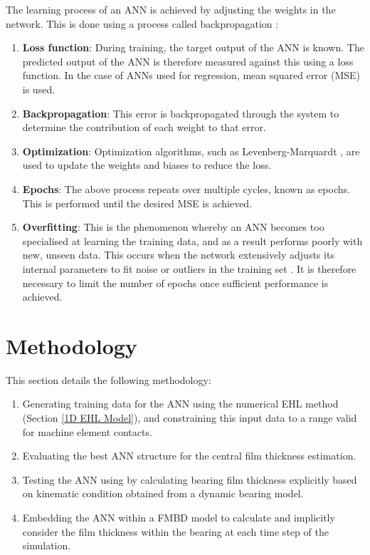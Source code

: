The learning process of an ANN is achieved by adjusting the weights in the network. This is done using a process called backpropagation \cite{Bishop2006}:
\begin{enumerate}
	\item \textbf{Loss function}: During training, the target output of the ANN is known. The predicted output of the ANN is therefore measured against this using a loss function. In the case of ANNs used for regression, mean squared error (MSE) is used.
	\item \textbf{Backpropagation}: This error is backpropagated through the system to determine the contribution of each weight to that error.
	\item \textbf{Optimization}: Optimization algorithms, such as Levenberg-Marquardt \cite{Levenberg1944} \cite{Marquardt1963} \cite{Wilamowski2010}, are used to update the weights and biases to reduce the loss.
	\item \textbf{Epochs}: The above process repeats over multiple cycles, known as epochs. This is performed until the desired MSE is achieved.
	\item \textbf{Overfitting}:  This is the phenomenon whereby an ANN becomes too specialised at learning the training data, and as a result performs poorly with new, unseen data. This occurs when the network extensively adjusts its internal parameters to fit noise or outliers in the training set \cite{Ying2019}. It is therefore necessary to limit the number of epochs once sufficient performance is achieved.
\end{enumerate}

\section{Methodology}

This section details the following methodology:

\begin{enumerate}
	\item Generating training data for the ANN using the numerical EHL method (Section \ref{1D EHL Model}), and constraining this input data to a range valid for machine element contacts.
	\item Evaluating the best ANN structure for the central film thickness estimation.
	\item Testing the ANN using by calculating bearing film thickness explicitly based on kinematic condition obtained from a dynamic bearing model.
	\item Embedding the ANN within a FMBD model to calculate and implicitly consider the film thickness within the bearing at each time step of the simulation.
	
\end{enumerate}

